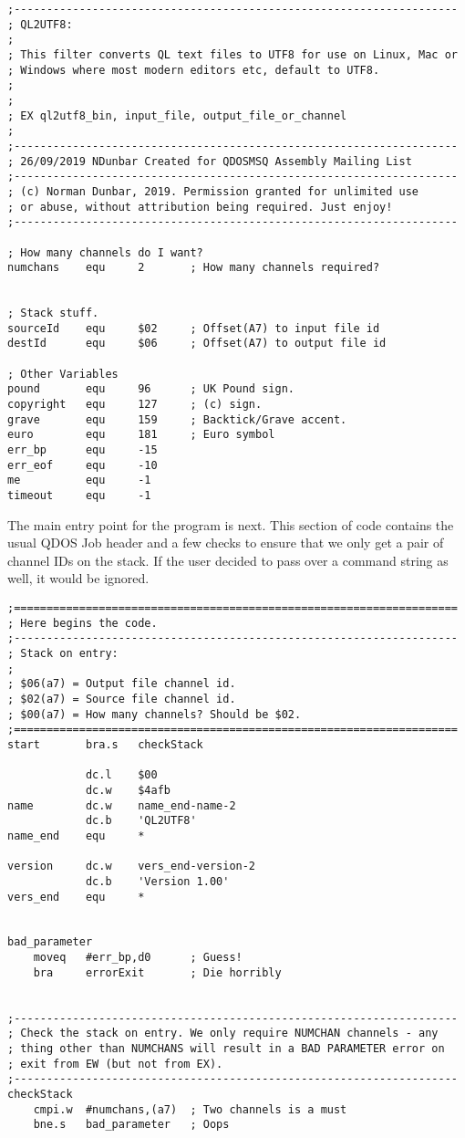 \begin{lstlisting}
;--------------------------------------------------------------------
; QL2UTF8:
;
; This filter converts QL text files to UTF8 for use on Linux, Mac or
; Windows where most modern editors etc, default to UTF8.
;
;
; EX ql2utf8_bin, input_file, output_file_or_channel
;
;--------------------------------------------------------------------
; 26/09/2019 NDunbar Created for QDOSMSQ Assembly Mailing List
;--------------------------------------------------------------------
; (c) Norman Dunbar, 2019. Permission granted for unlimited use
; or abuse, without attribution being required. Just enjoy!
;--------------------------------------------------------------------

; How many channels do I want?
numchans    equ     2       ; How many channels required?


; Stack stuff.
sourceId    equ     $02     ; Offset(A7) to input file id
destId      equ     $06     ; Offset(A7) to output file id

; Other Variables
pound       equ     96      ; UK Pound sign.
copyright   equ     127     ; (c) sign.
grave       equ     159     ; Backtick/Grave accent.
euro        equ     181     ; Euro symbol
err_bp      equ     -15
err_eof     equ     -10
me          equ     -1
timeout     equ     -1
\end{lstlisting}

The main entry point for the program is next. This section of code
contains the usual QDOS Job header and a few checks to ensure that
we only get a pair of channel IDs on the stack. If the user decided
to pass over a command string as well, it would be ignored.

\begin{lstlisting}
;====================================================================
; Here begins the code.
;--------------------------------------------------------------------
; Stack on entry:
;
; $06(a7) = Output file channel id.
; $02(a7) = Source file channel id.
; $00(a7) = How many channels? Should be $02.
;====================================================================
start       bra.s   checkStack

            dc.l    $00
            dc.w    $4afb
name        dc.w    name_end-name-2
            dc.b    'QL2UTF8'
name_end    equ     *

version     dc.w    vers_end-version-2
            dc.b    'Version 1.00'
vers_end    equ     *


bad_parameter
    moveq   #err_bp,d0      ; Guess!
    bra     errorExit       ; Die horribly


;--------------------------------------------------------------------
; Check the stack on entry. We only require NUMCHAN channels - any
; thing other than NUMCHANS will result in a BAD PARAMETER error on
; exit from EW (but not from EX).
;--------------------------------------------------------------------
checkStack
    cmpi.w  #numchans,(a7)  ; Two channels is a must
    bne.s   bad_parameter   ; Oops
\end{lstlisting}

